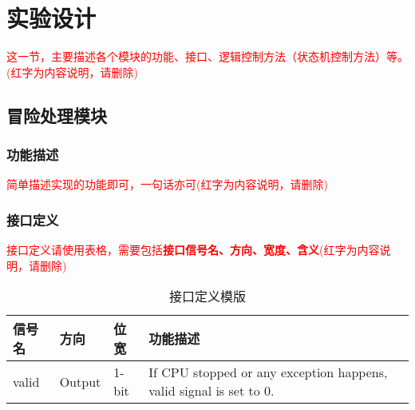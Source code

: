 \section{实验设计}
\textcolor{red}{这一节，主要描述各个模块的功能、接口、逻辑控制方法（状态机控制方法）等。(红字为内容说明，请删除)}
\subsection{冒险处理模块}\label{sub:hazard}
\subsubsection{功能描述}
\textcolor{red}{简单描述实现的功能即可，一句话亦可(红字为内容说明，请删除)}
\subsubsection{接口定义}
\textcolor{red}{接口定义请使用表格，需要包括\textbf{接口信号名、方向、宽度、含义}(红字为内容说明，请删除)}

\begin{table}[htp]
\caption{接口定义模版}\label{tab:signaldef}
\begin{center}
	\begin{tabular}{|l|l|l|p{6cm}|}
	\hline
	\textbf{信号名} & \textbf{方向} & \textbf{位宽} & \textbf{功能描述}\\ \hline \hline
	valid			& Output& 1-bit & If CPU stopped or any exception happens, valid signal is set to 0.\\ 
	\hline
	\end{tabular}
\end{center}
\end{table}
